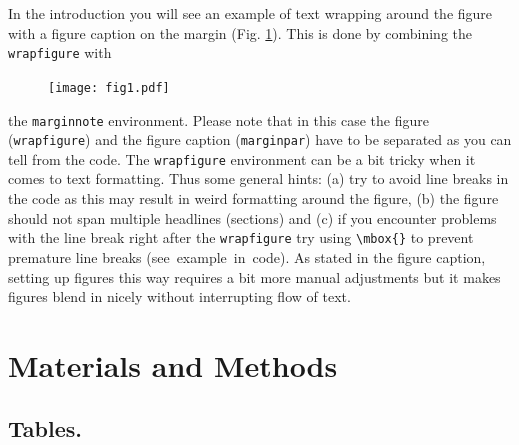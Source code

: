 \documentclass[10pt,letterpaper]{article}
\begin{document}
In the introduction you will see an example of text wrapping around the figure with a figure caption on the margin (Fig. \ref{fig1}). This is done by combining the \verb!wrapfigure! with %
\begin{figure}
\texttt{[image: fig1.pdf]}
\captionsetup{labelformat=empty} %
\caption{} %
\label{fig1} %
\end{figure} %
the \verb!marginnote! environment. Please note that in this case the figure (\verb!wrapfigure!) and the figure caption (\verb!marginpar!) have to be separated as you can tell from the code. The \verb!wrapfigure! environment can be a bit tricky when it comes to text formatting. Thus some general hints: (a) try to avoid line breaks in the code as this may result in weird formatting around the figure, (b) the figure should not span multiple headlines (sections) and (c) if you encounter problems with the line break right after the \verb!wrapfigure! try using \verb!\mbox{}! to prevent premature line breaks (\mbox{see example in code}). As stated in the figure caption, setting up figures this way requires a bit more manual adjustments but it makes figures blend in nicely without interrupting flow of text.

\section*{Materials and Methods}

\subsection*{Tables.} 
\end{document}
